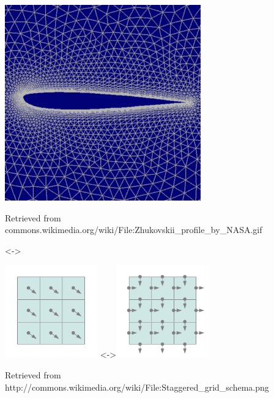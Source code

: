\begin{frame}
\begin{columns}[c]
\begin{figure}
\centering
\includegraphics[width=.5\textwidth]{Images/Attribute/Grid/Zhukovskii_profile_by_NASA}
\caption{Retrieved from commons.wikimedia.org/wiki/\allowbreak File:Zhukovskii\_profile\_by\_NASA.gif}
\uncover<\thenonstaggeredpauses->{
\includegraphics[width=0.35\textwidth]{Images/Attribute/Staggered/Staggered_grid_schema1}
\quad
\uncover<\thestaggeredpauses->{\includegraphics[width=0.35\textwidth]{Images/Attribute/Staggered/Staggered_grid_schema2}}
\caption{Retrieved from http://commons.wikimedia.org/\allowbreak wiki/File:Staggered\_grid\_schema.png}
}
\end{figure}

\end{columns}
\end{frame}